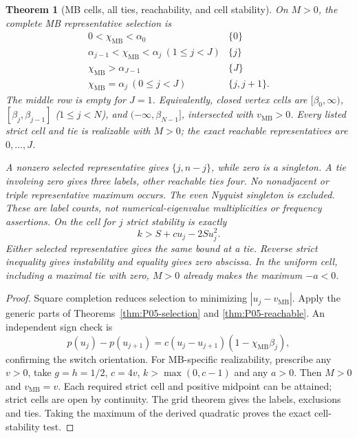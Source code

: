 \documentclass[11pt]{article}
\newcommand{\MB}{\mathrm{MB}}
\newtheorem{theorem}{Theorem}[section]
\theoremstyle{definition}
\theoremstyle{remark}
\begin{document}
\begin{theorem}[MB cells, all ties, reachability, and cell stability]
\label{thm:P08-selection}
On $M>0$, the complete MB representative selection is
\begin{equation}
\begin{array}{c|c}
0<\chi_{\MB}<\alpha_0&\{0\}\\
\alpha_{j-1}<\chi_{\MB}<\alpha_j\ (1\le j<J)&\{j\}\\
\chi_{\MB}>\alpha_{J-1}&\{J\}\\
\chi_{\MB}=\alpha_j\ (0\le j<J)&\{j,j+1\}.
\end{array}\label{eq:P08-cells}
\end{equation}
The middle row is empty for $J=1$. Equivalently, closed vertex cells are
$[\beta_0,\infty)$, $[\beta_j,\beta_{j-1}]$ ($1\le j<N$), and
$(-\infty,\beta_{N-1}]$, intersected with $v_{\MB}>0$.
Every listed strict cell and tie is realizable with $M>0$; the exact
reachable representatives are $0,\ldots,J$.

A nonzero selected representative gives $\{j,n-j\}$, while zero is a
singleton. A tie involving zero gives three labels, other reachable
ties four. No nonadjacent or triple representative maximum occurs.
The even Nyquist singleton is excluded. These are label counts, not
numerical-eigenvalue multiplicities or frequency assertions.
On the cell for $j$ strict stability is exactly
\begin{equation}
 \boxed{k>S+cu_j-2Su_j^2.}\label{eq:P08-cell-stability}
\end{equation}
Either selected representative gives the same bound at a tie.
Reverse strict inequality gives instability and equality gives zero
abscissa. In the uniform cell, including a maximal tie with zero,
$M>0$ already makes the maximum $-a<0$.
\end{theorem}
\begin{proof}
Square completion reduces selection to minimizing $|u_j-v_{\MB}|$.
Apply the generic parts of Theorems~\ref{thm:P05-selection} and
\ref{thm:P05-reachable}. An independent sign check is
\[
 p(u_j)-p(u_{j+1})=c(u_j-u_{j+1})(1-\chi_{\MB}\beta_j),
\]
confirming the switch orientation. For MB-specific realizability,
prescribe any $v>0$, take $g=h=1/2$, $c=4v$,
$k>\max(0,c-1)$ and any $a>0$. Then $M>0$ and $v_{\MB}=v$.
Each required strict cell and positive midpoint can be attained; strict
cells are open by continuity. The grid theorem gives the labels,
exclusions and ties. Taking the maximum of the derived quadratic proves
the exact cell-stability test.
\end{proof}
\end{document}
